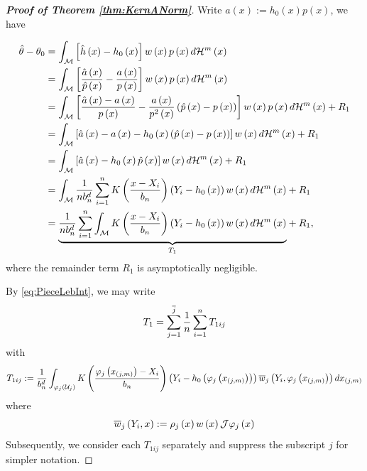 \documentclass[12pt,american]{article}
\theoremstyle{definition}
\theoremstyle{plain}
\theoremstyle{definition}
\theoremstyle{plain}
\theoremstyle{plain}
\theoremstyle{plain}
\theoremstyle{plain}
\theoremstyle{plain}
\begin{document}
\begin{proof}[\textbf{Proof of Theorem \ref{thm:KernANorm}}]
Write $a\left(x\right):=h_{0}\left(x\right)p\left(x\right)$, we have

\begin{align}
\hat{\theta}-\theta_{0} & =\int_{{\cal M}}\left[\hat{h}\left(x\right)-h_{0}\left(x\right)\right]w\left(x\right)p\left(x\right)d{\cal H}^{m}\left(x\right)\nonumber \\
 & =\int_{{\cal M}}\left[\frac{\hat{a}\left(x\right)}{\hat{p}\left(x\right)}-\frac{a\left(x\right)}{p\left(x\right)}\right]w\left(x\right)p\left(x\right)d{\cal H}^{m}\left(x\right)\nonumber \\
 & =\int_{{\cal M}}\left[\frac{\hat{a}\left(x\right)-a\left(x\right)}{p\left(x\right)}-\frac{a\left(x\right)}{p^{2}\left(x\right)}\left(\hat{p}\left(x\right)-p\left(x\right)\right)\right]w\left(x\right)p\left(x\right)d{\cal H}^{m}\left(x\right)+R_{1}\nonumber \\
 & =\int_{{\cal M}}\left[\hat{a}\left(x\right)-a\left(x\right)-h_{0}\left(x\right)\left(\hat{p}\left(x\right)-p\left(x\right)\right)\right]w\left(x\right)d{\cal H}^{m}\left(x\right)+R_{1}\nonumber \\
 & =\int_{{\cal M}}\left[\hat{a}\left(x\right)-h_{0}\left(x\right)\hat{p}\left(x\right)\right]w\left(x\right)d{\cal H}^{m}\left(x\right)+R_{1}\nonumber \\
 & =\int_{{\cal M}}\frac{1}{nb_{n}^{d}}\sum_{i=1}^{n}K\left(\frac{x-X_{i}}{b_{n}}\right)\left(Y_{i}-h_{0}\left(x\right)\right)w\left(x\right)d{\cal H}^{m}\left(x\right)+R_{1}\nonumber \\
 & =\underset{T_{1}}{\underbrace{\frac{1}{nb_{n}^{d}}\sum_{i=1}^{n}\int_{{\cal M}}K\left(\frac{x-X_{i}}{b_{n}}\right)\left(Y_{i}-h_{0}\left(x\right)\right)w\left(x\right)d{\cal H}^{m}\left(x\right)}}+R_{1},\label{eq:Kern_Ldh}
\end{align}
where the remainder term $R_{1}$ is asymptotically negligible.

By \eqref{eq:PieceLebInt}, we may write
\[
T_{1}=\sum_{j=1}^{\overline{j}}\frac{1}{n}\sum_{i=1}^{n}T_{1ij}
\]
with
\[
T_{1ij}:=\frac{1}{b_{n}^{d}}\int_{\varphi_{j}\left({\cal U}_{j}\right)}K\left(\frac{\varphi_{j}\left(x_{\left(j,m\right)}\right)-X_{i}}{b_{n}}\right)\left(Y_{i}-h_{0}\left(\varphi_{j}\left(x_{\left(j,m\right)}\right)\right)\right)\overline{w}_{j}\left(Y_{i},\varphi_{j}\left(x_{\left(j,m\right)}\right)\right)dx_{\left(j,m\right)}
\]
where
\[
\overline{w}_{j}\left(Y_{i},x\right):=\rho_{j}\left(x\right)w\left(x\right)\mathcal{J}\varphi_{j}\left(x\right)
\]
Subsequently, we consider each $T_{1ij}$ separately and suppress
the subscript $j$ for simpler notation.


\end{proof}
\end{document}

